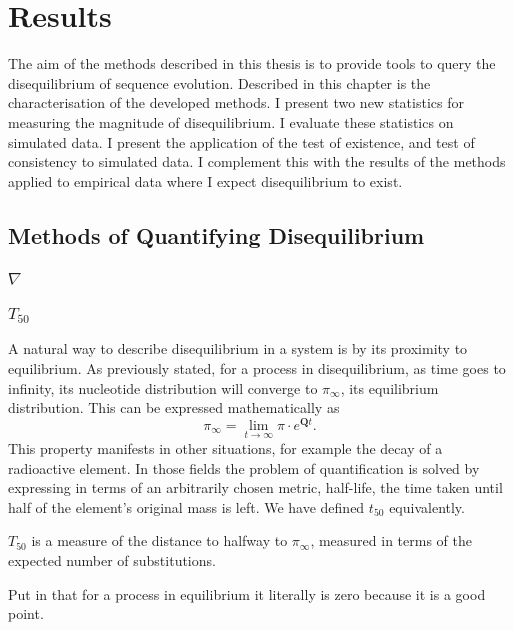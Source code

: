 \chapter{Results}

The aim of the methods described in this thesis is to provide tools to query the disequilibrium of sequence evolution. Described in this chapter is the characterisation of the developed methods. I present two new statistics for measuring the magnitude of disequilibrium. I evaluate these statistics on simulated data. I present the application of the test of existence, and test of consistency to simulated data. I complement this with the results of the methods applied to empirical data where I expect disequilibrium to exist.

\section{Methods of Quantifying Disequilibrium}

\subsection{$\nabla$}


\subsection{$T_{50}$}

A natural way to describe disequilibrium in a system is by its proximity to equilibrium. As previously stated, for a process in disequilibrium, as time goes to infinity, its nucleotide distribution will converge to $\pi_\infty$, its equilibrium distribution. This can be expressed mathematically as 
$$\pi_\infty = \lim_{t \to \infty}\pi \cdot e^{\mathbf{Q}t}.$$ 
This property manifests in other situations, for example the decay of a radioactive element. In those fields the problem of quantification is solved by expressing in terms of an arbitrarily chosen metric, half-life, the time taken until half of the element's original mass is left. We have defined ${t_{50}}$ equivalently.



${T_{50}}$ is a measure of the distance to halfway to $\pi_\infty$, measured in terms of the expected number of substitutions. 

Put in that for a process in equilibrium it literally is zero because it is a good point.




